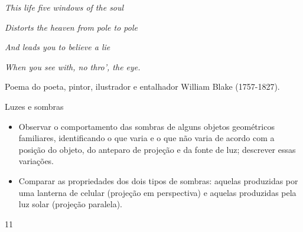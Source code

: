 \begin{reflection}

\begin{DUlineblock}{0em}
\item[] \emph{This life five windows of the soul}
\item[] \emph{Distorts the heaven from pole to pole}
\item[] \emph{And leads you to believe a lie}
\item[] \emph{When you see with, no thro’, the eye.}
\end{DUlineblock}

Poema do poeta, pintor, ilustrador e entalhador William Blake (1757-1827).
\end{reflection}

\cleardoublepage
\def\currentcolor{session1}
\begin{objectives}{Luzes e sombras}
{
\begin{itemize}
\item {} 
Observar o comportamento das sombras de alguns objetos geométricos familiares, identificando o que varia e o que não varia de acordo com a posição do objeto, do anteparo de projeção e da fonte de luz; descrever essas variações.

\item {} 
Comparar as propriedades dos dois tipos de sombras: aquelas produzidas por uma lanterna de celular (projeção em perspectiva) e aquelas produzidas pela luz solar (projeção paralela).

\end{itemize}
}{1}{1}
\end{objectives}

